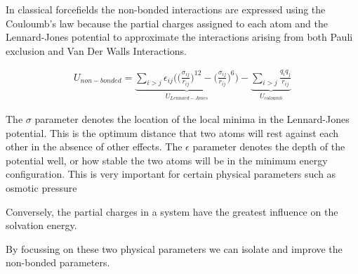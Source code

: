 In classical forcefields the non-bonded interactions are expressed using the Couloumb's law because the partial charges assigned to each atom and the Lennard-Jones potential to approximate the interactions arising from both Pauli exclusion and Van Der Walls Interactions.


\begin{equation}\label{nonbonded_eqs}
	\begin{aligned}
		U_{non-bonded} = \underbrace{\sum_{i>j} \epsilon_{ij} \Big( \Big(\frac{\sigma_{ij}}{r_{ij}}\Big)^{12} - \Big(\frac{\sigma_{ij}}{r_{ij}}\Big)^{6} \Big)}_{U_{Lennard-Jones}} - \underbrace{\sum_{i>j} \frac{q_i q_j } {r_{ij}}}_{U_{coloumb}}
	\end{aligned}
\end{equation}


The $\sigma$ parameter denotes the location of the local minima in the Lennard-Jones potential. This is the optimum distance that two atoms will rest against each other in the absence of other effects. The $\epsilon$ parameter denotes the depth of the potential well, or how stable the two atoms will be in the minimum energy configuration. This is very important for certain physical parameters such as osmotic pressure  \cite{yoo2018a}

Conversely, the partial charges in a system have the greatest influence on the solvation energy.

By focussing on these two physical parameters we can isolate and improve the non-bonded parameters.


